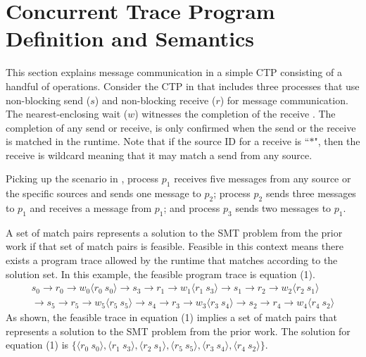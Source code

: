 \section{Concurrent Trace Program Definition and Semantics}

\examplefigone

This section explains message communication in a simple CTP consisting of a handful of operations. Consider the CTP in  that includes three processes that use non-blocking send ($s$) and non-blocking receive ($r$) for message communication. The nearest-enclosing wait ($w$) witnesses the completion of the receive \cite{DBLP:conf/kbse/HuangMM13}. The completion of any send or receive, is only confirmed when the send or the receive is matched in the runtime. Note that if the source ID for a receive is ``$\ast$", then the receive is wildcard meaning that it may match a send from any source. 

Picking up the scenario in , process $p_1$ receives five messages from any source or the specific sources and sends one message to $p_2$; process $p_2$ sends three messages to $p_1$ and receives a message from $p_1$; and process $p_3$ sends two messages to $p_1$. 


A set of match pairs represents a solution to the SMT problem from the prior work if that set of match pairs is feasible. Feasible in this context means there exists a program trace allowed by the runtime that matches according to the solution set. In this example, the feasible program trace is equation (1). 
\begin{equation}
\begin{split}
s_0\rightarrow r_0\rightarrow w_0\langle r_0\ s_0\rangle \rightarrow s_3\rightarrow r_1\rightarrow w_1\langle r_1\ s_3\rangle \rightarrow s_1\rightarrow r_2\rightarrow w_2\langle r_2\ s_1\rangle \\
\rightarrow s_5\rightarrow r_5\rightarrow w_5\langle r_5\ s_5\rangle \rightarrow s_4\rightarrow r_3\rightarrow w_3\langle r_3\ s_4\rangle \rightarrow s_2\rightarrow r_4\rightarrow w_4\langle r_4\ s_2\rangle
\end{split}
\end{equation} 
As shown, the feasible trace in equation (1) implies a set of match pairs that represents a solution to the SMT problem from the prior work. The solution for equation (1) is $\{\langle r_0\ s_0\rangle, \langle r_1\ s_3\rangle, \langle r_2\ s_1\rangle, \langle r_5\ s_5\rangle, \langle r_3\ s_4\rangle, \langle r_4\ s_2\rangle\}$.


